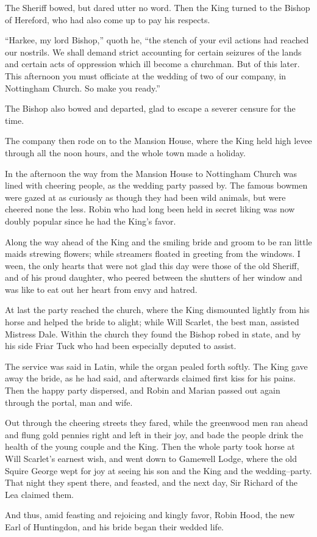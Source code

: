 The Sheriff bowed, but dared utter no word. Then the King turned to the
Bishop of Hereford, who had also come up to pay his respects.

``Harkee, my lord Bishop,'' quoth he, ``the stench of your evil actions
had reached our nostrils. We shall demand strict accounting for certain
seizures of the lands and certain acts of oppression which ill become a
churchman. But of this later. This afternoon you must officiate at the
wedding of two of our company, in Nottingham Church. So make you
ready.''

The Bishop also bowed and departed, glad to escape a severer censure for
the time.

The company then rode on to the Mansion House, where the King held high
levee through all the noon hours, and the whole town made a holiday.

In the afternoon the way from the Mansion House to Nottingham Church was
lined with cheering people, as the wedding party passed by. The famous
bowmen were gazed at as curiously as though they had been wild animals,
but were cheered none the less. Robin who had long been held in secret
liking was now doubly popular since he had the King's favor.

Along the way ahead of the King and the smiling bride and groom to be
ran little maids strewing flowers; while streamers floated in greeting
from the windows. I ween, the only hearts that were not glad this day
were those of the old Sheriff, and of his proud daughter, who peered
between the shutters of her window and was like to eat out her heart
from envy and hatred.

At last the party reached the church, where the King dismounted lightly
from his horse and helped the bride to alight; while Will Scarlet, the
best man, assisted Mistress Dale. Within the church they found the
Bishop robed in state, and by his side Friar Tuck who had been
especially deputed to assist.

The service was said in Latin, while the organ pealed forth softly. The
King gave away the bride, as he had said, and afterwards claimed first
kiss for his pains. Then the happy party dispersed, and Robin and Marian
passed out again through the portal, man and wife.

Out through the cheering streets they fared, while the greenwood men ran
ahead and flung gold pennies right and left in their joy, and bade the
people drink the health of the young couple and the King. Then the whole
party took horse at Will Scarlet's earnest wish, and went down to
Gamewell Lodge, where the old Squire George wept for joy at seeing his
son and the King and the wedding--party. That night they spent there,
and feasted, and the next day, Sir Richard of the Lea claimed them.

And thus, amid feasting and rejoicing and kingly favor, Robin Hood, the
new Earl of Huntingdon, and his bride began their wedded life.
